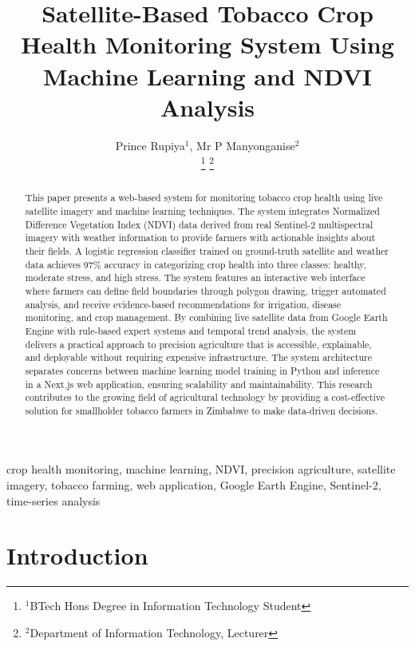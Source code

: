 \documentclass[journal]{IEEEtran}
\begin{document}
\title{Satellite-Based Tobacco Crop Health Monitoring System Using Machine Learning and NDVI Analysis}

\author{Prince Rupiya$^{1}$, Mr P Manyonganise$^{2}$\\
\thanks{$^{1}$BTech Hons Degree in Information Technology Student}
\thanks{$^{2}$Department of Information Technology, Lecturer}}

\maketitle

\begin{abstract}
This paper presents a web-based system for monitoring tobacco crop health using live satellite imagery and machine learning techniques. The system integrates Normalized Difference Vegetation Index (NDVI) data derived from real Sentinel-2 multispectral imagery with weather information to provide farmers with actionable insights about their fields. A logistic regression classifier trained on ground-truth satellite and weather data achieves 97\% accuracy in categorizing crop health into three classes: healthy, moderate stress, and high stress. The system features an interactive web interface where farmers can define field boundaries through polygon drawing, trigger automated analysis, and receive evidence-based recommendations for irrigation, disease monitoring, and crop management. By combining live satellite data from Google Earth Engine with rule-based expert systems and temporal trend analysis, the system delivers a practical approach to precision agriculture that is accessible, explainable, and deployable without requiring expensive infrastructure. The system architecture separates concerns between machine learning model training in Python and inference in a Next.js web application, ensuring scalability and maintainability. This research contributes to the growing field of agricultural technology by providing a cost-effective solution for smallholder tobacco farmers in Zimbabwe to make data-driven decisions.
\end{abstract}

\begin{IEEEkeywords}
crop health monitoring, machine learning, NDVI, precision agriculture, satellite imagery, tobacco farming, web application, Google Earth Engine, Sentinel-2, time-series analysis
\end{IEEEkeywords}

\section{Introduction}
\end{document}
